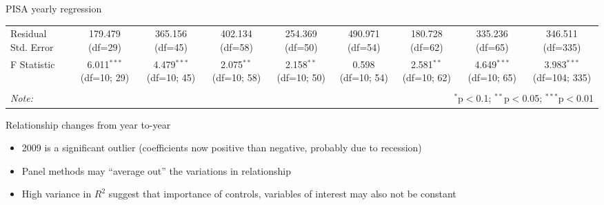 \documentclass[10pt]{beamer}
\begin{document}
\begin{frame}{PISA yearly regression}
\begin{table}[!htbp]
{\begin{tabular}{@{\extracolsep{1pt}}lcccccccc}
                 Residual Std. Error & 179.479 (df=29) & 365.156 (df=45) & 402.134 (df=58) & 254.369 (df=50) & 490.971 (df=54) & 180.728 (df=62) & 335.236 (df=65) & 346.511 (df=335) \\
                 F Statistic & 6.011$^{***}$ (df=10; 29) & 4.479$^{***}$ (df=10; 45) & 2.075$^{**}$ (df=10; 58) & 2.158$^{**}$ (df=10; 50) & 0.598$^{}$ (df=10; 54) & 2.581$^{**}$ (df=10; 62) & 4.649$^{***}$ (df=10; 65) & 3.983$^{***}$ (df=104; 335) \\
                \hline
                \hline \\[-1.8ex]
                \textit{Note:} & \multicolumn{8}{r}{$^{*}$p$<$0.1; $^{**}$p$<$0.05; $^{***}$p$<$0.01} \\
                \end{tabular}
        }
        \end{table}
        \small
        \begin{block}{Relationship changes from year to-year}
            \begin{itemize}
                \item 2009 is a significant outlier (coefficients now positive than negative, probably due to recession)
                \item Panel methods may ``average out'' the variations in relationship
                \item High variance in $R^2$ suggest that importance of controls, variables of interest may also not be constant
            \end{itemize}
        \end{block}
        
\end{frame}
\end{document}
